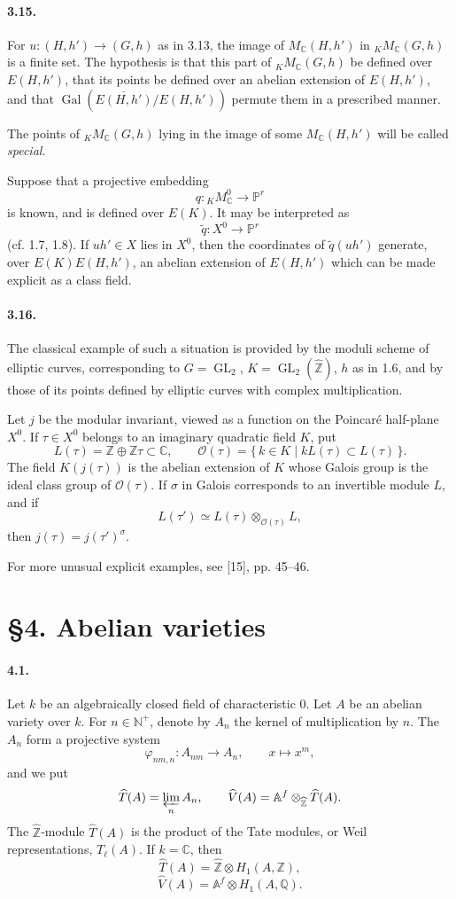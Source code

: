\documentclass[10pt]{article}
\newcommand{\Af}{\mathbb A^f}
\newcommand{\C}{\mathbb C}
\newcommand{\Q}{\mathbb Q}
\newcommand{\Z}{\mathbb Z}
\newcommand{\GL}{\operatorname{GL}}
\newcommand{\Gal}{\operatorname{Gal}}
\begin{document}
\paragraph{3.15.} For $u:(H,h')\longrightarrow(G,h)$ as in 3.13, the image of $M_{\C}(H,h')$ in ${}_K M_{\C}(G,h)$ is a finite set. The hypothesis is that this part of ${}_K M_{\C}(G,h)$ be defined over $E(H,h')$, that its points be defined over an abelian extension of $E(H,h')$, and that $\Gal(\overline{E(H,h')}/E(H,h'))$ permute them in a prescribed manner.

The points of ${}_K M_{\C}(G,h)$ lying in the image of some $M_{\C}(H,h')$ will be called \emph{special}.

Suppose that a projective embedding
\[
q:{}_K M_{\C}^{0}\longrightarrow \mathbb P^r
\]
is known, and is defined over $E(K)$. It may be interpreted as
\[
\widetilde q:X^0\longrightarrow \mathbb P^r
\]
(cf. 1.7, 1.8). If $uh'\in X$ lies in $X^0$, then the coordinates of $\widetilde q(uh')$ generate, over $E(K)E(H,h')$, an abelian extension of $E(H,h')$ which can be made explicit as a class field.

\paragraph{3.16.} The classical example of such a situation is provided by the moduli scheme of elliptic curves, corresponding to $G=\GL_2$, $K=\GL_2(\widehat{\Z})$, $h$ as in 1.6, and by those of its points defined by elliptic curves with complex multiplication.

Let $j$ be the modular invariant, viewed as a function on the Poincaré half-plane $X^0$. If $\tau\in X^0$ belongs to an imaginary quadratic field $K$, put
\[
L(\tau)=\Z\oplus \Z\tau\subset\C,
\qquad
\mathcal O(\tau)=\{\,k\in K\mid kL(\tau)\subset L(\tau)\,\}.
\]
The field $K(j(\tau))$ is the abelian extension of $K$ whose Galois group is the ideal class group of $\mathcal O(\tau)$. If $\sigma$ in Galois corresponds to an invertible module $L$, and if
\[
L(\tau')\simeq L(\tau)\otimes_{\mathcal O(\tau)}L,
\]
then $j(\tau)=j(\tau')^\sigma$.

For more unusual explicit examples, see [15], pp. 45--46.

\section*{\S 4. Abelian varieties}

\paragraph{4.1.} Let $k$ be an algebraically closed field of characteristic $0$. Let $A$ be an abelian variety over $k$. For $n\in\mathbb N^+$, denote by $A_n$ the kernel of multiplication by $n$. The $A_n$ form a projective system
\[
\varphi_{nm,n}:A_{nm}\longrightarrow A_n,\qquad x\longmapsto x^m,
\]
and we put
\[
\widehat T(A)=\varprojlim_n A_n,\qquad
\widehat V(A)=\Af\otimes_{\widehat{\Z}}\widehat T(A).
\]
The $\widehat{\Z}$-module $\widehat T(A)$ is the product of the Tate modules, or Weil representations, $T_\ell(A)$. If $k=\C$, then
\[
\tag{4.1.1}
\widehat T(A)=\widehat{\Z}\otimes H_1(A,\Z),
\]
\[
\tag{4.1.2}
\widehat V(A)=\Af\otimes H_1(A,\Q).
\]
\end{document}
